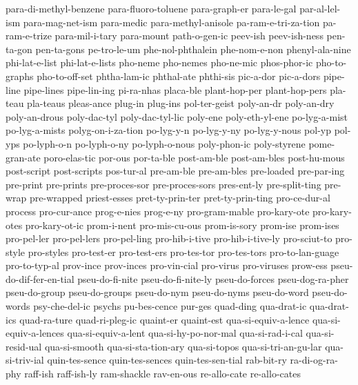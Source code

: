 {{{  para-di-methyl-benzene
  para-fluoro-toluene
  para-graph-er
  para-le-gal
  par-al-lel-ism
  para-mag-net-ism
  para-medic
  para-methyl-anisole
  pa-ram-e-tri-za-tion
  pa-ram-e-trize
  para-mil-i-tary
  para-mount
  path-o-gen-ic
  peev-ish
  peev-ish-ness
  pen-ta-gon
  pen-ta-gons
  pe-tro-le-um
  phe-nol-phthalein
  phe-nom-e-non
  phenyl-ala-nine
  phi-lat-e-list
  phi-lat-e-lists
  pho-neme
  pho-nemes
  pho-ne-mic
  phos-phor-ic
  pho-to-graphs
  pho-to-off-set
  phtha-lam-ic
  phthal-ate
  phthi-sis
  pic-a-dor
  pic-a-dors
  pipe-line
  pipe-lines
  pipe-lin-ing
  pi-ra-nhas
  placa-ble
  plant-hop-per
  plant-hop-pers
  pla-teau
  pla-teaus
  pleas-ance
  plug-in
  plug-ins
  pol-ter-geist
  poly-an-dr
  poly-an-dry
  poly-an-drous
  poly-dac-tyl
  poly-dac-tyl-lic
  poly-ene
  poly-eth-yl-ene
  po-lyg-a-mist
  po-lyg-a-mists
  polyg-on-i-za-tion
  po-lyg-y-n
  po-lyg-y-ny
  po-lyg-y-nous
  pol-yp
  pol-yps
  po-lyph-o-n
  po-lyph-o-ny
  po-lyph-o-nous
  poly-phon-ic
  poly-styrene
  pome-gran-ate
  poro-elas-tic
  por-ous
  por-ta-ble
  post-am-ble
  post-am-bles
  post-hu-mous
  post-script
  post-scripts
  pos-tur-al
  pre-am-ble
  pre-am-bles
  pre-loaded
  pre-par-ing
  pre-print
  pre-prints
  pre-proces-sor
  pre-proces-sors
  pres-ent-ly
  pre-split-ting
  pre-wrap
  pre-wrapped
  priest-esses
  pret-ty-prin-ter
  pret-ty-prin-ting
  pro-ce-dur-al
  process
  pro-cur-ance
  prog-e-nies
  prog-e-ny
  pro-gram-mable
  pro-kary-ote
  pro-kary-otes
  pro-kary-ot-ic
  prom-i-nent
  pro-mis-cu-ous
  prom-is-sory
  prom-ise
  prom-ises
  pro-pel-ler
  pro-pel-lers
  pro-pel-ling
  pro-hib-i-tive
  pro-hib-i-tive-ly
  pro-sciut-to
  pro-style
  pro-styles
  pro-test-er
  pro-test-ers
  pro-tes-tor
  pro-tes-tors
  pro-to-lan-guage
  pro-to-typ-al
  prov-ince
  prov-inces
  pro-vin-cial
  pro-virus
  pro-viruses
  prow-ess
  pseu-do-dif-fer-en-tial
  pseu-do-fi-nite
  pseu-do-fi-nite-ly
  pseu-do-forces
  pseu-dog-ra-pher
  pseu-do-group
  pseu-do-groups
  pseu-do-nym
  pseu-do-nyms
  pseu-do-word
  pseu-do-words
  psy-che-del-ic
  psychs
  pu-bes-cence
  pur-ges
  quad-ding
  qua-drat-ic
  qua-drat-ics
  quad-ra-ture
  quad-ri-pleg-ic
  quaint-er
  quaint-est
  qua-si-equiv-a-lence
  qua-si-equiv-a-lences
  qua-si-equiv-a-lent
  qua-si-hy-po-nor-mal
  qua-si-rad-i-cal
  qua-si-resid-ual
  qua-si-smooth
  qua-si-sta-tion-ary
  qua-si-topos
  qua-si-tri-an-gu-lar
  qua-si-triv-ial
  quin-tes-sence
  quin-tes-sences
  quin-tes-sen-tial
  rab-bit-ry
  ra-di-og-ra-phy
  raff-ish
  raff-ish-ly
  ram-shackle
  rav-en-ous
  re-allo-cate
  re-allo-cates
}}}
